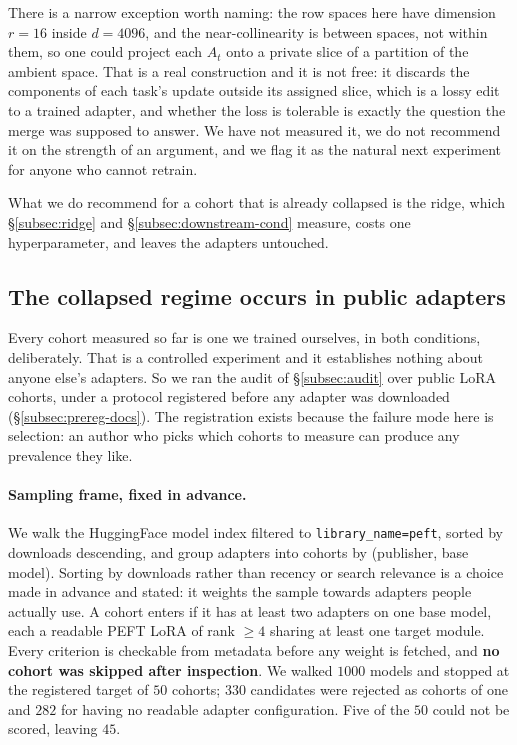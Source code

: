 There is a narrow exception worth naming: the row spaces here have dimension
$r = 16$ inside $d = 4096$, and the near-collinearity is between spaces, not
within them, so one could project each $A_t$ onto a private slice of a
partition of the ambient space. That is a real construction and it is not free:
it discards the components of each task's update outside its assigned slice,
which is a lossy edit to a trained adapter, and whether the loss is tolerable
is exactly the question the merge was supposed to answer. We have not measured
it, we do not recommend it on the strength of an argument, and we flag it as
the natural next experiment for anyone who cannot retrain.

What we do recommend for a cohort that is already collapsed is the ridge, which
\S\ref{subsec:ridge} and \S\ref{subsec:downstream-cond} measure, costs one
hyperparameter, and leaves the adapters untouched.

\subsection{The collapsed regime occurs in public adapters}
\label{subsec:prevalence}

Every cohort measured so far is one we trained ourselves, in both conditions,
deliberately. That is a controlled experiment and it establishes nothing about
anyone else's adapters. So we ran the audit of \S\ref{subsec:audit} over public
LoRA cohorts, under a protocol registered before any adapter was downloaded
(\S\ref{subsec:prereg-docs}). The registration exists because the failure mode
here is selection: an author who picks which cohorts to measure can produce any
prevalence they like.

\paragraph{Sampling frame, fixed in advance.} We walk the HuggingFace model
index filtered to \texttt{library\_name=peft}, sorted by downloads descending,
and group adapters into cohorts by (publisher, base model). Sorting by
downloads rather than recency or search relevance is a choice made in advance
and stated: it weights the sample towards adapters people actually use. A
cohort enters if it has at least two adapters on one base model, each a
readable PEFT LoRA of rank $\geq 4$ sharing at least one target module. Every
criterion is checkable from metadata before any weight is fetched, and
\textbf{no cohort was skipped after inspection}. We walked $1000$ models and
stopped at the registered target of $50$ cohorts; $330$ candidates were
rejected as cohorts of one and $282$ for having no readable adapter
configuration. Five of the $50$ could not be scored, leaving $45$.

